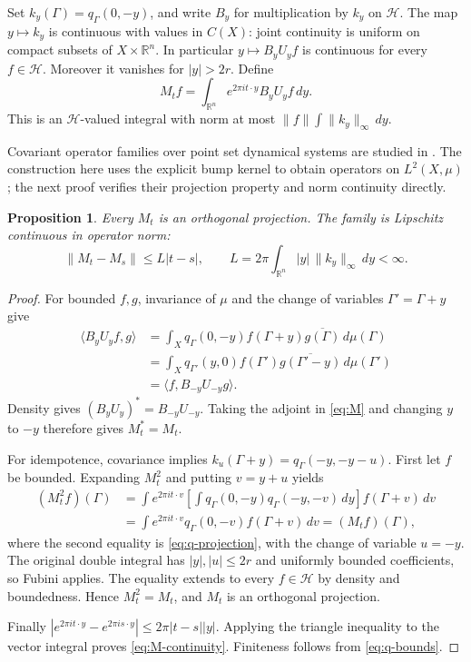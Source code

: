 \documentclass[a4paper,12pt,reqno]{amsart}
\newtheorem{proposition}[theorem]{Proposition}
\theoremstyle{remark}
\numberwithin{equation}{section}
\newcommand{\R}{\mathbb R}
\newcommand{\Hh}{\mathcal H}
\begin{document}
Set $k_y(\Gamma)=q_\Gamma(0,-y)$, and write $B_y$ for multiplication by
$k_y$ on $\Hh$. The map $y\mapsto k_y$ is continuous with values in
$C(X)$: joint continuity is uniform on compact subsets of $X\times\R^n$.
In particular $y\mapsto B_yU_yf$ is continuous for every $f\in\Hh$.
Moreover it vanishes for $|y|>2r$. Define
\begin{equation}\label{eq:M}
 M_tf=\int_{\R^n}e^{2\pi it\cdot y}B_yU_yf\,dy.
\end{equation}
This is an $\Hh$-valued integral with norm at most
$\|f\|\int\|k_y\|_\infty\,dy$.

Covariant operator families over point set dynamical systems are studied
in \cite[Sections~2--3]{LenzStollmann}. The construction here uses the
explicit bump kernel to obtain operators on $L^2(X,\mu)$; the next
proof verifies their projection property and norm continuity directly.

\begin{proposition}\label{prop:M}
Every $M_t$ is an orthogonal projection. The family is Lipschitz continuous
in operator norm:
\begin{equation}\label{eq:M-continuity}
 \|M_t-M_s\|\leq L|t-s|,\qquad
 L=2\pi\int_{\R^n}|y|\,\|k_y\|_\infty\,dy<\infty.
\end{equation}
\end{proposition}

\begin{proof}
For bounded $f,g$, invariance of $\mu$ and the change of variables
$\Gamma'=\Gamma+y$ give
\begin{align*}
 \langle B_yU_yf,g\rangle
 &=\int_X q_\Gamma(0,-y)f(\Gamma+y)\overline{g(\Gamma)}\,d\mu(\Gamma)\\
 &=\int_X q_{\Gamma'}(y,0)f(\Gamma')
                  \overline{g(\Gamma'-y)}\,d\mu(\Gamma')\\
 &=\langle f,B_{-y}U_{-y}g\rangle.
\end{align*}
Density gives $(B_yU_y)^*=B_{-y}U_{-y}$. Taking the adjoint in
\eqref{eq:M} and changing $y$ to $-y$ therefore gives $M_t^*=M_t$.

For idempotence, covariance implies
$k_u(\Gamma+y)=q_\Gamma(-y,-y-u)$. First let $f$ be bounded.
Expanding $M_t^2$ and putting $v=y+u$ yields
\begin{align*}
 (M_t^2f)(\Gamma)
 &=\int e^{2\pi it\cdot v}
       \left[\int q_\Gamma(0,-y)q_\Gamma(-y,-v)\,dy\right]
       f(\Gamma+v)\,dv\\
 &=\int e^{2\pi it\cdot v}q_\Gamma(0,-v)f(\Gamma+v)\,dv
 =(M_tf)(\Gamma),
\end{align*}
where the second equality is \eqref{eq:q-projection}, with the change
of variable $u=-y$. The original double integral has $|y|,|u|\leq2r$
and uniformly bounded coefficients, so Fubini applies. The equality
extends to every $f\in\Hh$ by density and boundedness. Hence $M_t^2=M_t$,
and $M_t$ is an orthogonal projection.

Finally $|e^{2\pi it\cdot y}-e^{2\pi is\cdot y}|\leq2\pi|t-s||y|$.
Applying the triangle inequality to the vector integral proves
\eqref{eq:M-continuity}. Finiteness follows from \eqref{eq:q-bounds}.
\end{proof}
\end{document}

